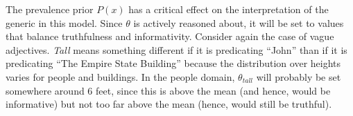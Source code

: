 \documentclass[10pt,letterpaper]{article}
\begin{document}

The prevalence prior $P(x)$ has a critical effect on the interpretation of the generic in this model. Since $\theta$ is actively reasoned about, it will be set to values that balance truthfulness and informativity. Consider again the case of vague adjectives. \emph{Tall} means something different if it is predicating ``John'' than if it is predicating ``The Empire State Building'' because the distribution over heights varies for people and buildings. In the people domain, $\theta_{tall}$ will probably be set somewhere around 6 feet, since this is above the mean (and hence, would be informative) but not too far above the mean (hence, would still be truthful). 

%
%
%
%
%



%
\end{document}
